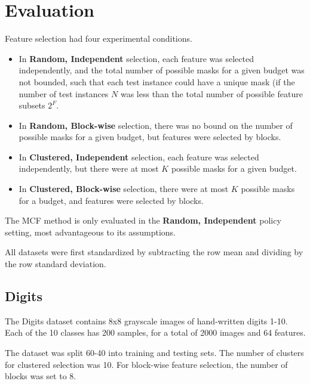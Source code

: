 \section{Evaluation}

Feature selection had four experimental conditions.

\begin{itemize}
\item
In \textbf{Random, Independent} selection, each feature was selected independently, and the total number of possible masks for a given budget was not bounded, such that each test instance could have a unique mask (if the number of test instances $N$ was less than the total number of possible feature subsets $2^F$.

\item
In \textbf{Random, Block-wise} selection, there was no bound on the number of possible masks for a given budget, but features were selected by blocks.

\item
In \textbf{Clustered, Independent} selection, each feature was selected independently, but there were at most $K$ possible masks for a given budget.

\item
In \textbf{Clustered, Block-wise} selection, there were at most $K$ possible masks for a budget, and features were selected by blocks.
\end{itemize}

The MCF method is only evaluated in the \textbf{Random, Independent} policy setting, most advantageous to its assumptions.

All datasets were first standardized by subtracting the row mean and dividing by the row standard deviation.

\subsection{Digits}
The Digits dataset contains 8x8 grayscale images of hand-written digits 1-10.
Each of the 10 classes has 200 samples, for a total of 2000 images and 64 features.

The dataset was split 60-40 into training and testing sets.
The number of clusters for clustered selection was 10.
For block-wise feature selection, the number of blocks was set to 8.

